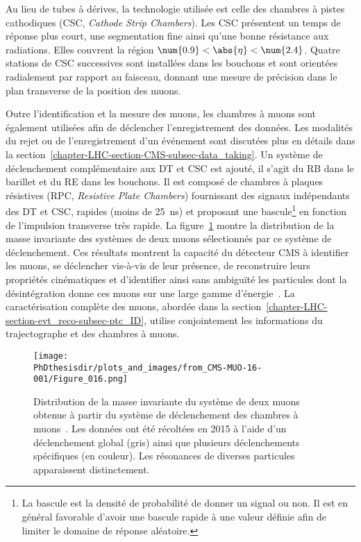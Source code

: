 Au lieu de tubes à dérives, la technologie utilisée est celle des chambres à pistes cathodiques (CSC, \emph{Cathode Strip Chambers}).
Les CSC présentent un temps de réponse plus court, une segmentation fine ainsi qu'une bonne résistance aux radiations.
Elles couvrent la région $\num{0.9}<\abs{\eta}<\num{2.4}$.
Quatre stations de CSC successives sont installées dans les bouchons et sont orientées radialement par rapport au faisceau, donnant une mesure de précision dans le plan transverse de la position des muons.
\par Outre l'identification et la mesure des muons, les chambres à muons sont également utilisées afin de déclencher l'enregistrement des données.
Les modalités du rejet ou de l'enregistrement d'un événement sont discutées plus en détails dans la section~\ref{chapter-LHC-section-CMS-subsec-data_taking}.
Un système de déclenchement complémentaire aux DT et CSC est ajouté, il s'agit du RB dans le barillet et du RE dans les bouchons.
Il est composé de chambres à plaques résistives (RPC, \emph{Resistive Plate Chambers}) fournissant des signaux indépendants des DT et CSC, rapides (moins de \SI{25}{\nano\second}) et proposant une bascule\footnote{La bascule est la densité de probabilité de donner un signal ou non. Il est en général favorable d'avoir une bascule rapide à une valeur définie afin de limiter le domaine de réponse aléatoire.} en fonction de l'impulsion transverse très rapide.
La figure~\ref{fig-chapter-LHC-section-CMS-subsec-muons-CMS-MUO-16-001-Figure_016} montre la distribution de la masse invariante des systèmes de deux muons sélectionnés par ce système de déclenchement.
Ces résultats montrent la capacité du détecteur CMS à identifier les muons, se déclencher vis-à-vis de leur présence, de reconstruire leurs propriétés cinématiques et d'identifier ainsi sans ambiguïté les particules dont la désintégration donne ces muons sur une large gamme d'énergie~\cite{CMS-MUO-16-001}.
La caractérisation complète des muons, abordée dans la section~\ref{chapter-LHC-section-evt_reco-subsec-ptc_ID}, utilise conjointement les informations du trajectographe et des chambres à muons.
\begin{figure}[h]
\centering
\texttt{[image: \\PhDthesisdir/plots\_and\_images/from\_CMS-MUO-16-001/Figure\_016.png]}
\caption[Distribution de la masse invariante de deux muons.]{Distribution de la masse invariante du système de deux muons obtenue à partir du système de déclenchement des chambres à muons~\cite{CMS-MUO-16-001}. Les données ont été récoltées en 2015 à l'aide d'un déclenchement global (gris) ainsi que plusieurs déclenchements spécifiques (en couleur). Les résonances de diverses particules apparaissent distinctement.}
\label{fig-chapter-LHC-section-CMS-subsec-muons-CMS-MUO-16-001-Figure_016}
\end{figure}